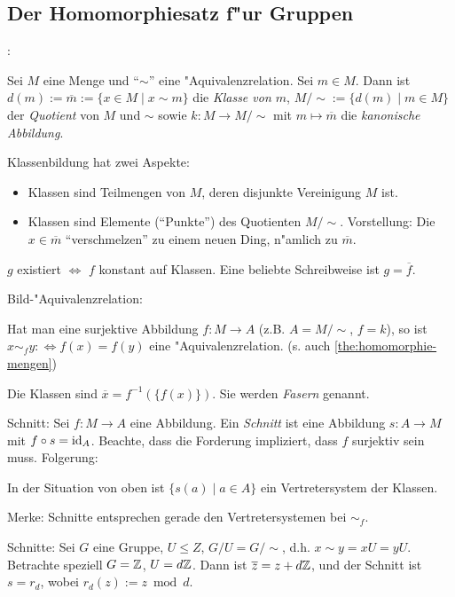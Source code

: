 \subsection{Der Homomorphiesatz f"ur Gruppen}
:{
  Sei $M$ eine Menge und ``$\sim$'' eine "Aquivalenzrelation. Sei $m\in M$.
  Dann ist $d(m):=\overline m:=\{x\in M\mid x\sim m\}$  die \emph{Klasse von $m$},
  $M/\sim:=\{d(m)\mid m\in M\}$ der \emph{Quotient} von $M$ und $\sim$ sowie
  $k:M\to M/\sim$ mit $m\mapsto \overline m$ die \emph{kanonische Abbildung}.
  
  Klassenbildung hat zwei Aspekte:
  \begin{itemize}
    \item Klassen sind Teilmengen von $M$, deren disjunkte Vereinigung 
      $M$ ist.
    \item Klassen sind Elemente (``Punkte'') des Quotienten $M/ \sim$.
      Vorstellung: Die $x\in \overline m$ ``verschmelzen'' zu einem
      neuen Ding, n"amlich zu $\overline m$.
    \end{itemize}
  $g$ existiert $\iff$ $f$ konstant auf Klassen. Eine beliebte Schreibweise
  ist $g=\overline f$.
  }
 Bild-"Aquivalenzrelation:{
  Hat man eine surjektive Abbildung $f:M\to A$ (z.B. $A=M/ \sim $, $f=k$), so
  ist $x\sim_f y :\iff f(x)=f(y)$ eine "Aquivalenzrelation. 
  (s. auch \ref{the:homomorphie-mengen})
  
  Die Klassen sind $\overline x=f^{-1}(\{f(x)\})$. Sie werden 
  \emph{Fasern} genannt.
  }
 Schnitt:{
  Sei $f:M\to A$ eine Abbildung.
  Ein \emph{Schnitt} ist eine Abbildung $s:A\to M$ mit $f\circ s=\operatorname{id}_A$.
  Beachte, dass die Forderung impliziert, dass $f$ surjektiv sein muss.
  }
\remark Folgerung:{
  In der Situation von oben ist $\{s(a)\mid a\in A\}$ ein Vertretersystem der Klassen.
  
  Merke: Schnitte entsprechen gerade den Vertretersystemen bei $\sim_f$.
  }
\example Schnitte:{
  Sei $G$ eine Gruppe, $U\leq Z$, $G/U=G/ \sim$, d.h. $x\sim y= xU=yU$.
  Betrachte speziell $G=\mathbb Z$, $U=d\mathbb Z$. 
  Dann ist $\overline z=z+d\mathbb Z$, und der Schnitt ist $s=r_d$, wobei
  $r_d(z):= z\bmod d$.
  }
